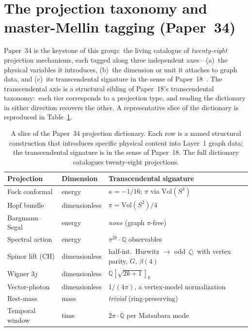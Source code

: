 \documentclass[aps,pra,twocolumn,superscriptaddress,longbibliography,nofootinbib]{revtex4-2}
\begin{document}
\section{The projection taxonomy and master-Mellin tagging (Paper~34)}

Paper~34 is the keystone of this group:\ the living catalogue of
\emph{twenty-eight} projection mechanisms, each tagged along three
independent axes---(a)~the physical variables it introduces, (b)~the
dimension or unit it attaches to graph data, and (c)~its transcendental
signature in the sense of Paper~18~\cite{loutey_paper18}.  The
transcendental axis is a structural sibling of Paper~18's transcendental
taxonomy:\ each tier corresponds to a projection type, and reading
the dictionary in either direction recovers the other.  A representative
slice of the dictionary is reproduced in Table~\ref{tab:axes}.

\begin{table}[t]
\centering\small
\begin{tabular}{p{2.5cm} p{1.7cm} p{2.9cm}}
\toprule
Projection & Dimension & Transcendental signature \\
\midrule
Fock conformal & energy & $\kappa=-1/16$; $\pi$ via $\mathrm{Vol}(S^3)$ \\
Hopf bundle & dimensionless & $\pi = \mathrm{Vol}(S^2)/4$ \\
Bargmann--Segal & energy & \textit{none} (graph $\pi$-free) \\
Spectral action & energy & $\pi^{2k}\!\cdot\mathbb{Q}$ observables \\
Spinor lift (CH) & dimensionless & half-int.\ Hurwitz $\to$ odd~$\zeta$;\ with vertex parity, $G$, $\beta(4)$ \\
Wigner $3j$ & dimensionless & $\mathbb{Q}[\sqrt{2k{+}1}]_k$ \\
Vector-photon & dimensionless & $1/(4\pi)$, a vertex-model normalization \\
Rest-mass & mass & \textit{trivial} (ring-preserving) \\
Temporal window & time & $2\pi\!\cdot\mathbb{Q}$ per Matsubara mode \\
\bottomrule
\end{tabular}
\caption{A slice of the Paper~34 projection dictionary.  Each row is a
named structural construction that introduces specific physical content
into Layer~1 graph data; the transcendental signature is in the sense of
Paper~18.  The full dictionary catalogues twenty-eight projections.}
\label{tab:axes}
\end{table}
\end{document}
